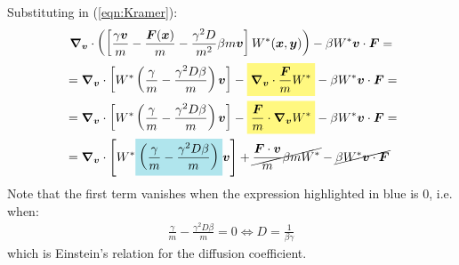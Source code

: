 \documentclass[../template.tex]{subfiles}
\begin{document}
\begin{exo}
    Substituting in (\ref{eqn:Kramer}):
    \begin{align*}
        \grad_{\bm{v}} \cdot  \left( \left[\frac{\gamma \bm{v}}{m} - \frac{\bm{F}(\bm{x})}{m} - \frac{\gamma^2 D}{m^2} \beta m \bm{v} \right] W^*(\bm{x},\bm{y}) \right) - \beta W^* \bm{v} \cdot \bm{F} = \span \\
        &= \grad_{\bm{v}} \cdot \left[ W^*\left(\frac{\gamma}{m} - \frac{\gamma^2 D \beta}{m}  \right) \bm{v}\right ] - \hlc{Yellow}{\grad_{\bm{v}} \cdot \frac{\bm{F}}{m}W^*}  - \beta W^* \bm{v} \cdot \bm{F} = \\
        &=  \grad_{\bm{v}} \cdot \left[ W^*\left(\frac{\gamma}{m} - \frac{\gamma^2 D \beta}{m}  \right) \bm{v}\right ] - \hlc{Yellow}{\frac{\bm{F}}{m} \cdot \grad_{\bm{v}} W^*}  - \beta W^* \bm{v} \cdot \bm{F} = \\
        &= \grad_{\bm{v}} \cdot \left[ W^*\hlc{SkyBlue}{\left(\frac{\gamma}{m} - \frac{\gamma^2 D \beta}{m}  \right) }\bm{v}\right ] + \cancel{\frac{\bm{F} \cdot \bm{v}}{m} \beta m W^*} - \cancel{\beta W^* \bm{v} \cdot \bm{F}}
    \end{align*}
    Note that the first term vanishes when the expression highlighted in blue is $0$, i.e. when:
    \begin{align*}
        \frac{\gamma}{m} - \frac{\gamma^2 D \beta}{m} = 0 \Leftrightarrow D = \frac{1}{\beta \gamma}
    \end{align*}
    which is Einstein's relation for the diffusion coefficient.
\end{exo}
\end{document}
